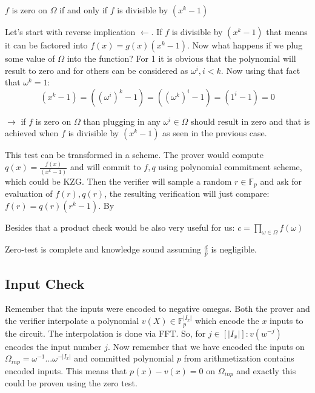 \begin{lemma}
    $f$ is zero on $\Omega$ if and only if $f$ is divisible by $(x^k - 1)$
\end{lemma}

\begin{dukaz}
    Let's start with reverse implication $\leftarrow$. If $f$ is divisible by $(x^k - 1)$ that means it can be factored into $f(x) = g(x)(x^k - 1)$. Now what happens if we plug some value of $\Omega$ into the function? For 1 it is obvious that the polynomial will result to zero and for others can be considered as $\omega^i, i<k$. Now using that fact that $\omega^k = 1$:
    $$(x^k - 1) = ((\omega^{i})^k - 1) = ((\omega^{k})^i - 1) = (1^i - 1) = 0$$
    
    $\rightarrow$ if $f$ is zero on $\Omega$ than plugging in any $\omega^i \in \Omega$ should result in zero and that is achieved when $f$ is divisible by $(x^k - 1)$ as seen in the previous case.
\end{dukaz}

This test can be transformed in a scheme. The prover would compute $q(x) = \frac{f(x)}{(x^k -1)}$ and will commit to $f, q$ using polynomial commitment scheme, which could be KZG. Then the verifier will sample a random $r \in \mathbb{F}_p$ and ask for evaluation of $f(r), q(r)$, the resulting verification will just compare: $f(r) = q(r)(r^k - 1)$. By %

Besides that a product check would be also very useful for us: $c = \prod_{\omega \in \Omega} f(\omega)$


\begin{theorem}
    Zero-test is complete and knowledge sound assuming $\frac{d}{p}$ is negligible.
\end{theorem}

\subsection{Input Check}
Remember that the inputs were encoded to negative omegas. Both the prover and the verifier interpolate a polynomial $v(X) \in \mathbb{F}_p^{|I_x|}$ which encode the $x$ inputs to the circuit. The interpolation is done via FFT. So, for $j \in [|I_x|]: v(w^{-j})$ encodes the input number $j$. Now remember that we have encoded the inputs on $\Omega_{inp} = {\omega^{-1} ... \omega^{-|I_x|}}$ and committed polynomial $p$ from arithmetization contains encoded inputs. This means that $p(x) - v(x) = 0$ on $\Omega_{inp}$ and exactly this could be proven using the zero test.

